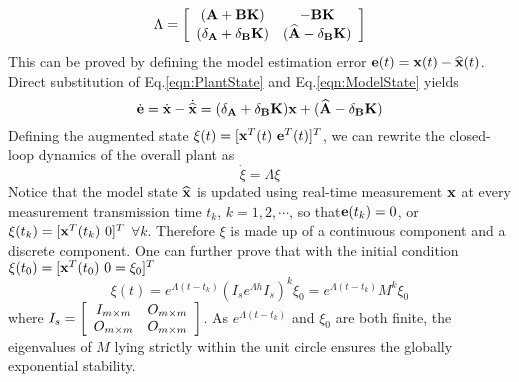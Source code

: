 \documentclass[letterpaper, 10 pt, conference]{ieeeconf}\IEEEoverridecommandlockouts%
\begin{document}
\begin{equation}
  \Lambda = \left[\begin{array}{cc}
              (\mathbf{A} + \mathbf{B}\mathbf{K})                    & -\mathbf{B}\mathbf{K}\\
              (\delta_{\mathbf{A}} + \delta_{\mathbf{B}}\mathbf{K})  & (\widehat{\mathbf{A}} - \delta_{\mathbf{B}}\mathbf{K})
            \end{array}\right]
\end{equation}
This can be proved by defining the model estimation error $\mathbf{e}(t) = \mathbf{x}(t) - \widehat{\mathbf{x}}(t)$. Direct substitution of Eq.\ref{eqn:PlantState} and Eq.\ref{eqn:ModelState} yields
\begin{equation}
  \dot{\mathbf{e}} = \dot{\mathbf{x}} - \dot{\widehat{\mathbf{x}}} = (\delta_{\mathbf{A}} + \delta_{\mathbf{B}}\mathbf{K})\mathbf{x} + (\widehat{\mathbf{A}} - \delta_{\mathbf{B}}\mathbf{K})
\end{equation}
Defining the augmented state $\xi(t) = [\mathbf{x}^T(t)\ \mathbf{e}^T(t)]^T$, we can rewrite the closed-loop dynamics of the overall plant as
\begin{equation}
  \dot{\xi} = \Lambda\xi
\end{equation}
Notice that the model state $\widehat{\mathbf{x}}$ is updated using real-time measurement $\mathbf{x}$ at every measurement transmission time $t_k$, $k = 1,2,\cdots$,  so that$\mathbf{e}(t_k) = 0$, or $\xi(t_k) = [\mathbf{x}^T(t_k)\ 0]^T$ $\forall k$. Therefore $\xi$ is made up of a continuous component and a discrete component. One can further prove that with the initial condition $\xi(t_0) = [\mathbf{x}^T(t_0)\ 0 = \xi_0]^T$
\begin{equation}
  \xi(t) = e^{\Lambda(t - t_k)}(I_se^{\Lambda h}I_s)^k\xi_0 =  e^{\Lambda(t - t_k)}M^k\xi_0
\end{equation}
where $I_s = \displaystyle{\left[\begin{array}{cc}
          I_{m\times m} & O_{m\times m}\\
          O_{m\times m} & O_{m\times m}
        \end{array}\right]}$. As $e^{\Lambda(t - t_k)}$ and $\xi_0$ are both finite, the eigenvalues of $M$ lying strictly within the unit circle ensures the globally exponential stability.


\end{document}
